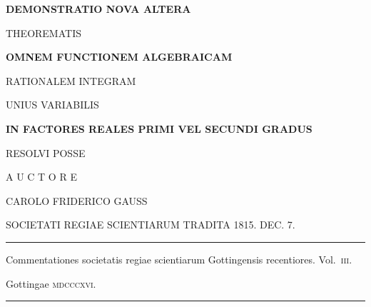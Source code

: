 \thispagestyle{empty}
\begin{center}
\vspace*{.25in}
{\large\bfseries DEMONSTRATIO NOVA ALTERA}\par
\vspace{.18in}
THEOREMATIS\par
\vspace{.35in}
{\Large\bfseries OMNEM FUNCTIONEM ALGEBRAICAM\par
\medskip RATIONALEM INTEGRAM}\par
\vspace{.25in}
UNIUS VARIABILIS\par
\vspace{.25in}
{\bfseries IN FACTORES REALES PRIMI VEL SECUNDI GRADUS}\par
\vspace{.25in}
RESOLVI POSSE\par
\vspace{.6in}
A U C T O R E\par
\vspace{.3in}
{\large CAROLO FRIDERICO GAUSS}\par
\vspace{.35in}
SOCIETATI REGIAE SCIENTIARUM TRADITA 1815. DEC. 7.\par
\vspace{.65in}
\rule{.88\linewidth}{.3pt}\par
\medskip
{\small Commentationes societatis regiae scientiarum Gottingensis recentiores. Vol.~\textsc{iii}.\par}
\medskip
Gottingae \textsc{mdcccxvi}.\par
\medskip
\rule{.88\linewidth}{.3pt}
\end{center}
\clearpage
